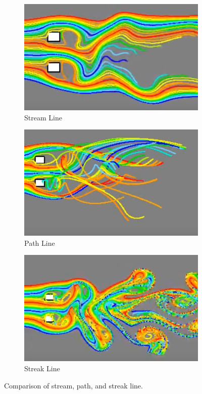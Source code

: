 \begin{figure}[H]
	\centering
	\begin{subfigure}{0.3\textwidth}	
		\centering
		\includegraphics[width=\linewidth]{Sketches/StreamLine}
		\caption{Stream Line}
		\label{fig:streamlines}
	\end{subfigure}
	\hfill
	\begin{subfigure}{0.3\textwidth}
		\centering
		\includegraphics[width=\linewidth]{Sketches/PathLine}
		\caption{Path Line}
		\label{fig:pathline}
	\end{subfigure}%
	\hfill
	\begin{subfigure}{0.3\textwidth}
		\centering
		\includegraphics[width=\linewidth]{Sketches/StreakLine}
		\caption{Streak Line}
		\label{fig:streakline}
	\end{subfigure}
	\caption{Comparison of stream, path, and streak line.}
\end{figure}




